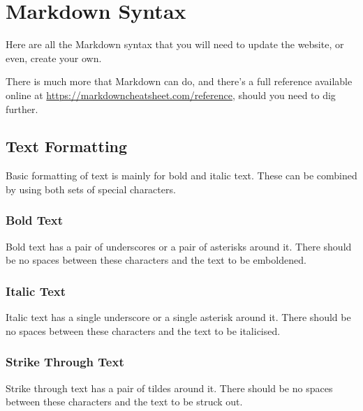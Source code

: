 \chapter{Markdown Syntax}\label{chap: Markdown Syntax}

Here are all the Markdown syntax that you will need to update the website, or even, create your own.

There is much more that Markdown can do, and there's a full reference available online at \url{https://markdowncheatsheet.com/reference}, should you need to dig further.

\section{Text Formatting}

Basic formatting of text is mainly for bold and italic text. These can be combined by using both sets of special characters.

\subsection{Bold Text}

Bold text has a pair of underscores or a pair of asterisks around it. There should be no spaces between these characters and the text to be emboldened.\\

\noindent{}

\subsection{Italic Text}

Italic text has a single underscore or a single asterisk around it. There should be no spaces between these characters and the text to be italicised.\\

\noindent{}

\subsection{Strike Through Text}

Strike through text has a pair of tildes around it. There should be no spaces between these characters and the text to be struck out.\\

\noindent{}

